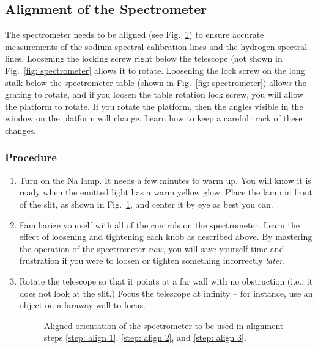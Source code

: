\documentclass[addpoints]{physlabs}
\begin{document}
\begin{labsection}
\begin{experiment}
\subsection*{Alignment of the Spectrometer}

The spectrometer needs to be aligned (see Fig.~\ref{fig: aligned spectrometer}) to ensure accurate measurements of the sodium spectral calibration lines and the hydrogen spectral lines. Loosening the locking screw right below the telescope (not shown in Fig.~\ref{fig: spectrometer} allows it to rotate. Loosening the lock screw on the long stalk below the spectrometer table (shown in Fig.~\ref{fig: spectrometer}) allows the grating to rotate, and if you loosen the table rotation lock screw, you will allow the platform to rotate. If you rotate the platform, then the angles visible in the window on the platform will change. Learn how to keep a careful track of these changes.

\subsubsection*{Procedure}

\begin{enumerate}
    \item Turn on the Na lamp. It needs a few minutes to warm up. You will know it is ready when the emitted light has a warm yellow glow. Place the lamp in front of the slit, as shown in Fig.~\ref{fig: aligned spectrometer}, and center it by eye as best you can.
    \item Familiarize yourself with all of the controls on the spectrometer. Learn the effect of loosening and tightening each knob as described above. By mastering the operation of the spectrometer \textsl{now}, you will save yourself time and frustration if you were to loosen or tighten something incorrectly \textsl{later}.
    \item Rotate the telescope so that it points at a far wall with no obstruction (i.e., it does not look at the slit.) Focus the telescope at infinity -- for instance, use an object on a faraway wall to focus.

    \begin{figure}[ht]
        \centering
        \scalebox{0.85}{}
        \caption{Aligned orientation of the spectrometer to be used in alignment steps \ref{step: align 1}, \ref{step: align 2}, and \ref{step: align 3}.}
        \label{fig: aligned spectrometer}
    \end{figure}


\end{enumerate}
\end{experiment}
\end{labsection}
\end{document}
